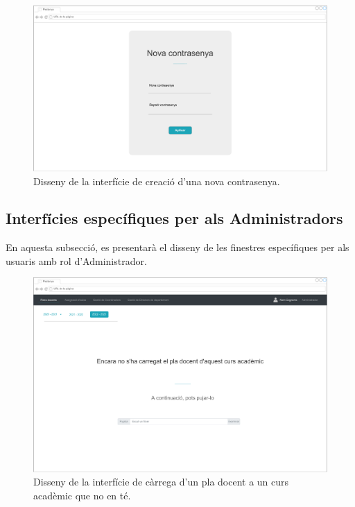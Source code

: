 \documentclass[a4paper,12pt]{ThesisStyle}
\begin{document}
\begin{figure}[H]
	\centering
	\includegraphics[width=\textwidth]{assets/interfaces/login/newPassword.pdf}
	\caption{\label{img:newPassword}Disseny de la interfície de creació d'una nova contrasenya.}
\end{figure}

\subsection{Interfícies específiques per als Administradors}
\label{subsec:interficies_administradors}

En aquesta subsecció, es presentarà el disseny de les finestres específiques per als usuaris amb rol d'Administrador.

\begin{figure}[H]
	\centering
	\includegraphics[width=\textwidth]{assets/interfaces/administradors/plansDocents/mainNoCarregat.pdf}
	\caption{\label{img:plansDocents_mainNoCarregat}Disseny de la interfície de càrrega d'un pla docent a un curs acadèmic que no en té.}
\end{figure}
\end{document}
